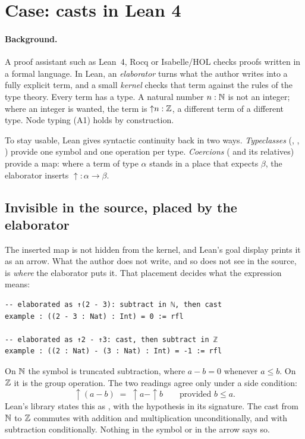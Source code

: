 \section{Case: casts in Lean 4}
\label{sec:casts}

\paragraph{Background.} A proof assistant such as Lean~4, Rocq or Isabelle/HOL checks
proofs written in a formal language. In Lean, an \emph{elaborator} turns what the author
writes into a fully explicit term, and a small \emph{kernel} checks that term against the
rules of the type theory. Every term has a type. A natural number $n : \mathbb{N}$ is not an
integer; where an integer is wanted, the term is ${\uparrow}n : \mathbb{Z}$, a different term of a
different type. Node typing (A1) holds by construction.

To stay usable, Lean gives syntactic continuity back in two ways. \emph{Typeclasses}
(, , ) provide one symbol and one operation per type.
\emph{Coercions} ( and its relatives) provide a map: where a term of type
$\alpha$ stands in a place that expects $\beta$, the elaborator inserts
${\uparrow} : \alpha \to \beta$.

\subsection{Invisible in the source, placed by the elaborator}

The inserted map is not hidden from the kernel, and Lean's goal display prints it as an
arrow. What the author does not write, and so does not see in the source, is \emph{where}
the elaborator puts it. That placement decides what the expression means:
\begin{lstlisting}
-- elaborated as ↑(2 - 3): subtract in ℕ, then cast
example : ((2 - 3 : Nat) : Int) = 0 := rfl

-- elaborated as ↑2 - ↑3: cast, then subtract in ℤ
example : ((2 : Nat) - (3 : Nat) : Int) = -1 := rfl
\end{lstlisting}
On $\mathbb{N}$ the symbol \code{-} is truncated subtraction, where $a - b = 0$ whenever
$a \le b$. On $\mathbb{Z}$ it is the group operation. The two readings agree only under a side
condition:
\[
  {\uparrow}(a - b) \;=\; {\uparrow}a - {\uparrow}b \qquad\text{provided } b \le a .
\]
Lean's library states this as , with the hypothesis in its
signature. The cast from $\mathbb{N}$ to $\mathbb{Z}$ commutes with addition and multiplication
unconditionally, and with subtraction conditionally. Nothing in the symbol \code{-} or in
the arrow says so.

